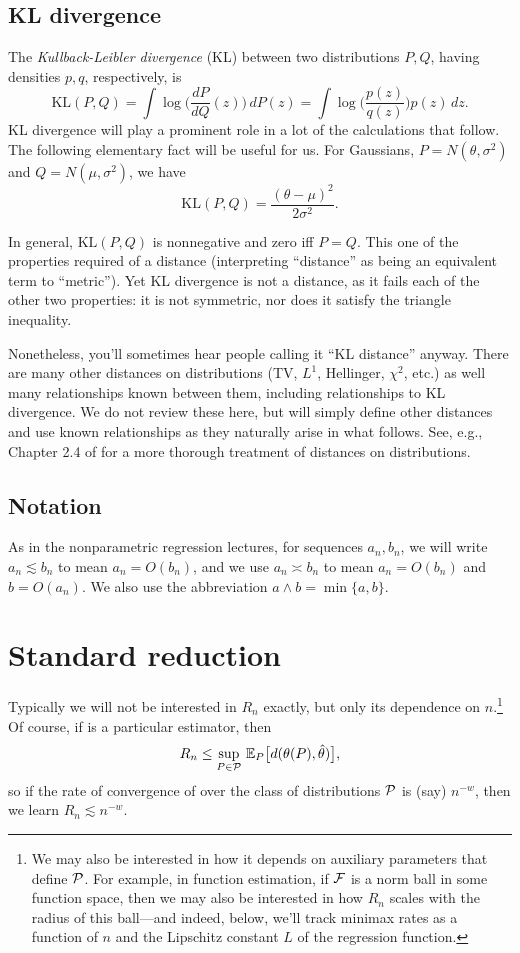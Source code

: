 \documentclass{article}
\begin{document}
\subsection{KL divergence}

\def\KL{\mathrm{KL}}

The \emph{Kullback-Leibler divergence} (KL) between two distributions $P,Q$,
having densities $p,q$, respectively, is 
\[
\KL(P,Q) = \int \log\bigg( \frac{dP}{dQ}(z) \bigg) \, dP(z)
= \int \log\bigg( \frac{p(z)}{q(z)} \bigg) p(z) \, dz.
\]
KL divergence will play a prominent role in a lot of the calculations that
follow. The following elementary fact will be useful for us. For Gaussians, $P = 
N(\theta, \sigma^2)$ and $Q = N(\mu, \sigma^2)$, we have  
\[
\KL(P, Q) = \frac{(\theta-\mu)^2}{2\sigma^2}.
\]

In general, $\KL(P,Q)$ is nonnegative and zero iff $P=Q$. This one of the
properties required of a distance (interpreting ``distance'' as being an
equivalent term to ``metric''). Yet KL divergence is not a distance, as it fails
each of the other two properties: it is not symmetric, nor does it satisfy the
triangle inequality.

Nonetheless, you'll sometimes hear people calling it ``KL distance''
anyway. There are many other distances on distributions (TV, $L^1$, Hellinger,
$\chi^2$, etc.) as well many relationships known between them, including
relationships to KL divergence. We do not review these here, but will simply
define other distances and use known relationships as they naturally arise in
what follows. See, e.g., Chapter 2.4 of \citet{tsybakov2009introduction} for a
more thorough treatment of distances on distributions.     

\subsection{Notation}

As in the nonparametric regression lectures, for sequences $a_n,b_n$, we will
write $a_n \lesssim b_n$ to mean $a_n = O(b_n)$, and we use $a_n \asymp b_n$ to
mean $a_n = O(b_n)$ and $b = O(a_n)$. We also use the abbreviation $a \wedge b
= \min\{a,b\}$.

\section{Standard reduction}

Typically we will not be interested in $R_n$ exactly, but only its dependence on
$n$.\footnote{We may also be interested in how it depends on auxiliary
  parameters that define $\mathcal{P}$. For example, in function estimation, if $\mathcal{F}$ is
  a norm ball in some function space, then we may also be interested in how
  $R_n$ scales with the radius of this ball---and indeed, below, we'll track
  minimax rates as a function of $n$ and the Lipschitz constant $L$ of the
  regression function.}  
Of course, if \smash{$\htheta$} is a particular estimator, then 
\[
R_n \leq \sup_{P \in \mathcal{P}} \, \mathbb{E}_P \big[ d(\theta(P), \hat{\theta}) \big], 
\]
so if the rate of convergence of \smash{$\htheta$} over the class of
distributions $\mathcal{P}$ is (say) $n^{-w}$, then we learn $R_n\lesssim n^{-w}$.  
\end{document}
